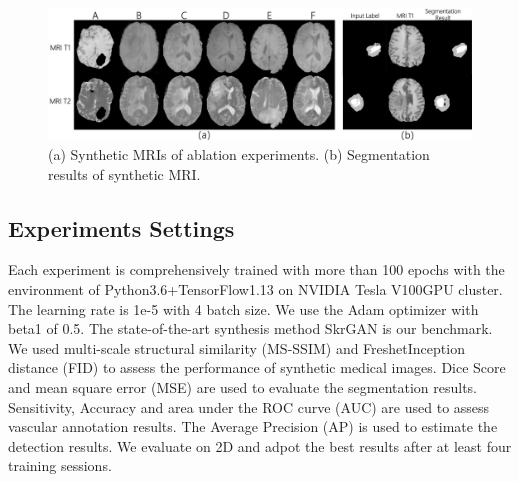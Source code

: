 \documentclass[runningheads]{llncs}
\begin{document}
	\begin{figure}[th]
		\centering
		\includegraphics[width=0.9\linewidth]{figures/ablation}
		\caption{(a) Synthetic MRIs of ablation experiments. (b) Segmentation results of synthetic MRI. }
		\label{ablation_and_seg}
	\end{figure}
	\begin{table}[th]
		\begin{center}
			\caption{Lesion generation methods experiments.}
			\label{label_test}
		\end{center}
	\end{table}
	\subsection{Experiments Settings}
	Each experiment is comprehensively trained with more than 100 epochs with the environment of Python3.6+TensorFlow1.13 on NVIDIA Tesla V100GPU cluster. The learning rate is 1e-5 with 4 batch size. We use the Adam optimizer with beta1 of 0.5.
	The state-of-the-art synthesis method SkrGAN\cite{96zhang2019skrgan:} is our benchmark. We used multi-scale structural similarity (MS-SSIM) and FreshetInception distance (FID)\cite{100karras2017progressive} to assess the performance of synthetic medical images. Dice Score\cite {95dice1945measures} and mean square error (MSE) are used to evaluate the segmentation results. Sensitivity, Accuracy and area under the ROC curve (AUC) are used to assess vascular annotation results. The Average Precision (AP) is used to estimate the detection results. We evaluate on 2D and adpot the best results after at least four training sessions.	
\end{document}
